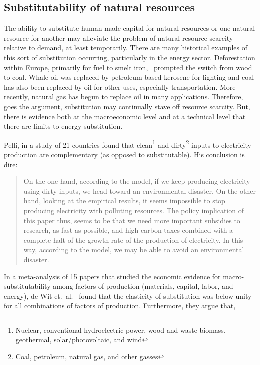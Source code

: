 \subsection{Substitutability of natural resources}

The ability to substitute human-made capital for natural resources
or one natural resource for another 
may alleviate the problem of natural resource scarcity relative to demand,
at least temporarily.
There are many historical examples of this sort of substitution occurring,
particularly in the energy sector.
Deforestation within Europe,
primarily for fuel to smelt iron,~\cite{Smil1994}
prompted the switch from wood to coal.
Whale oil was replaced by petroleum-based kerosene for lighting and
coal has also been replaced by oil for other uses, 
especially transportation.\cite{Weissenbacher2009}
More recently, natural gas has begun to replace oil in many applications.
Therefore, goes the argument, 
substitution may continually stave off resource scarcity.
But, there is evidence both at the macroeconomic level and 
at a technical level that there are limits to energy substitution.

Pelli, in a study of 21 countries 
found that clean\footnote{Nuclear, 
	conventional hydroelectric power, wood and waste biomass, 
	geothermal, solar/photovoltaic, and wind
	}
and dirty\footnote{Coal, 
	petroleum, natural gas, and other gasses
	}
inputs to electricity production
are complementary (as opposed to substitutable).\cite{Pelli:2012wv}
His conclusion is dire:

\begin{quote}
	On the one hand, according to the model, 
	if we keep producing electricity using dirty inputs, 
	we head toward an environmental disaster. 
	On the other hand, looking at the empirical results, 
	it seems impossible to stop producing electricity with polluting resources. 
	The policy implication of this paper thus, 
	seems to be that we need more important subsidies to research, 
	as fast as possible, 
	and high carbon taxes combined with a complete halt 
	of the growth rate of the production of electricity. 
	In this way, according to the model, 
	we may be able to avoid an environmental disaster.\cite[p.~25]{Pelli:2012wv}
\end{quote}

In a meta-analysis of 15 papers that studied 
the economic evidence for macro-substitutability
among factors of production (materials, capital, labor, and energy), 
de Wit et.\ al.~\cite{de-Wit:2013aa} found that the elasticity of substitution was 
below unity for all combinations of factors of production.
Furthermore, they argue that, 


